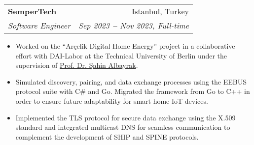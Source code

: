 \documentclass[letterpaper,11pt]{article}
\makeatletter
\newcommand{\resumeItem}[1]{
  \item\small{
    {#1 \vspace{-2pt}}
  }
}
\newcommand{\resumeSubheading}[4]{
  \vspace{-2pt}\item
    \begin{tabular*}{0.97\textwidth}[t]{l@{\extracolsep{\fill}}r}
      \textbf{#1} & #2 \\
      \textit{\small#3} & \textit{\small #4} \\
    \end{tabular*}\vspace{-7pt}
}
\newcommand{\resumeItemListStart}{\begin{itemize}}
\newcommand{\resumeItemListEnd}{\end{itemize}\vspace{-5pt}}
\makeatother
\begin{document}
\resumeSubheading
{SemperTech}{Istanbul, Turkey}
{Software Engineer}{Sep 2023 \textbf{--} Nov 2023, Full-time}
\resumeItemListStart
\resumeItem{Worked on the “Arçelik Digital Home Energy” project in a collaborative effort with DAI-Labor at the Technical University of Berlin under the supervision of \href{https://www.linkedin.com/in/prof-dr-dr-h-c-sahin-albayrak-65452a1/}{\color{blue}Prof. Dr. Şahin Albayrak}.}
\resumeItem{Simulated discovery, pairing, and data exchange processes using the EEBUS protocol suite with C\# and Go. Migrated the framework from Go to C++ in order to ensure future adaptability for smart home IoT devices.}
\resumeItem{Implemented the TLS protocol for secure data exchange using the X.509 standard and integrated multicast DNS for seamless communication to complement the development of SHIP and SPINE protocols.}
\resumeItemListEnd

\end{document}
